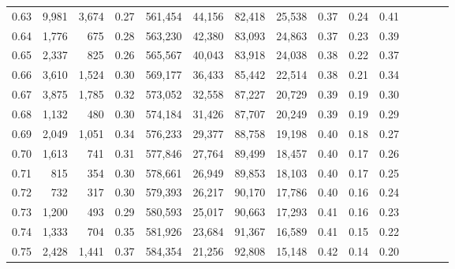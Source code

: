 \begin{tabular}{rrrcrrrrrrrrrrr}
0.63 &   9,981 &  3,674 &                                       0.27 &  561,454 &   44,156 &   82,418 &   25,538 &  0.37 &  0.24 &                         0.41 \\
0.64 &   1,776 &    675 &                                       0.28 &  563,230 &   42,380 &   83,093 &   24,863 &  0.37 &  0.23 &                         0.39 \\
0.65 &   2,337 &    825 &                                       0.26 &  565,567 &   40,043 &   83,918 &   24,038 &  0.38 &  0.22 &                         0.37 \\
0.66 &   3,610 &  1,524 &                                       0.30 &  569,177 &   36,433 &   85,442 &   22,514 &  0.38 &  0.21 &                         0.34 \\
0.67 &   3,875 &  1,785 &                                       0.32 &  573,052 &   32,558 &   87,227 &   20,729 &  0.39 &  0.19 &                         0.30 \\
0.68 &   1,132 &    480 &                                       0.30 &  574,184 &   31,426 &   87,707 &   20,249 &  0.39 &  0.19 &                         0.29 \\
0.69 &   2,049 &  1,051 &                                       0.34 &  576,233 &   29,377 &   88,758 &   19,198 &  0.40 &  0.18 &                         0.27 \\
0.70 &   1,613 &    741 &                                       0.31 &  577,846 &   27,764 &   89,499 &   18,457 &  0.40 &  0.17 &                         0.26 \\
0.71 &     815 &    354 &                                       0.30 &  578,661 &   26,949 &   89,853 &   18,103 &  0.40 &  0.17 &                         0.25 \\
0.72 &     732 &    317 &                                       0.30 &  579,393 &   26,217 &   90,170 &   17,786 &  0.40 &  0.16 &                         0.24 \\
0.73 &   1,200 &    493 &                                       0.29 &  580,593 &   25,017 &   90,663 &   17,293 &  0.41 &  0.16 &                         0.23 \\
0.74 &   1,333 &    704 &                                       0.35 &  581,926 &   23,684 &   91,367 &   16,589 &  0.41 &  0.15 &                         0.22 \\
0.75 &   2,428 &  1,441 &                                       0.37 &  584,354 &   21,256 &   92,808 &   15,148 &  0.42 &  0.14 &                         0.20 \\

\end{tabular}
